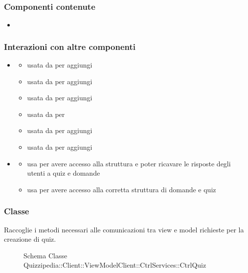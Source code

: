 \subsubsection{Componenti contenute}
\begin{itemize}
\item {}
\end{itemize}
\subsubsection{Interazioni con altre componenti}
\begin{itemize}
\item {}
\begin{itemize}
\item usata da  per aggiungi
\item usata da  per aggiungi
\item usata da  per aggiungi
\item usata da  per 
\item usata da  per aggiungi
\item usata da  per aggiungi
\end{itemize}
\item {}
\begin{itemize}
\item usa  per avere accesso alla struttura e poter ricavare le risposte degli utenti a quiz e domande
\item usa  per avere accesso alla corretta struttura di domande e quiz
\end{itemize}
\end{itemize}
\subsubsection{Classe }
Raccoglie i metodi necessari alle comunicazioni tra view e model richieste per la creazione di quiz.
\begin{figure}[H]
\centering
\noindent{}
\caption[Schema Classe CtrlQuiz]{Schema Classe Quizzipedia::Client::ViewModelClient::CtrlServices::CtrlQuiz}
\end{figure}
